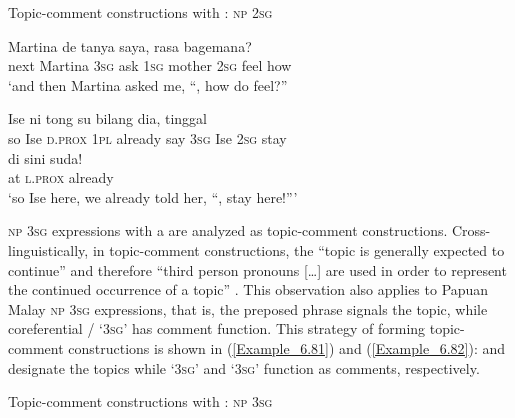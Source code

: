 \begin{styleExampleTitle}
Topic-comment constructions with : \textsc{np} {\textbar} \textsc{2sg}
\end{styleExampleTitle}

\ea
\label{Example_6.79}
 {Martina} {de} {tanya} {saya,} {} {} \textup{\textbar} {} {} {rasa} {bagemana?}\\ %
 next  Martina  \textsc{3sg}  ask  \textsc{1sg}  mother {} {} {}  \textsc{2sg}  feel  how\\

\glt
‘and then Martina asked me, ``, how do  feel?'' \textstyleExampleSource{[081015-005-NP.0018]}
\z

\ea
\label{Example_6.80}
 {Ise} {{ni}} {tong} {su} {bilang} {dia,} {} {} \textup{\textbar} {} {} {tinggal}\\ %
 {so}  Ise  {\textsc{d.prox}}  \textsc{1pl}  already  say  \textsc{3sg}  Ise  {} {} {} \textsc{2sg}  stay\\
\gll di  {sini}  {suda!}\\
 at  {\textsc{l.prox}}  {already}\\

\glt
‘so Ise here, we already told her, ``, stay here!''' \textstyleExampleSource{[080917-008-NP.0026]}
\z


\textsc{np} \textsc{3sg} expressions with a  are analyzed as topic-comment constructions. Cross-linguistically, in topic-comment constructions, the “topic is generally expected to continue” and therefore “third person pronouns [{\ldots}] are used in order to represent the continued occurrence of a topic” \citep[209]{Bhat.2007}. This observation also applies to Papuan Malay \textsc{np} {\textbar} \textsc{3sg} expressions, that is, the preposed  phrase signals the topic, while coreferential / ‘\textsc{3sg}’ has comment function. This strategy of forming topic-comment constructions is shown in (\ref{Example_6.81}) and (\ref{Example_6.82}):  and  designate the topics while  ‘\textsc{3sg}’ and  ‘\textsc{3sg}’ function as comments, respectively.



\begin{styleExampleTitle}
Topic-comment constructions with : \textsc{np} {\textbar} \textsc{3sg}
\end{styleExampleTitle}

